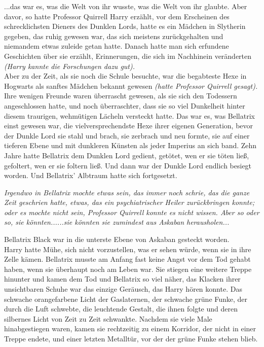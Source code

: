 {...das war es, was die Welt von ihr wusste, was die Welt von ihr glaubte. Aber davor, so hatte Professor Quirrell Harry erzählt, vor dem Erscheinen des schrecklichsten Dieners des Dunklen Lords, hatte es ein Mädchen in Slytherin gegeben, das ruhig gewesen war, das sich meistens zurückgehalten und niemandem etwas zuleide getan hatte. Danach hatte man sich erfundene Geschichten über sie erzählt, Erinnerungen, die sich im Nachhinein veränderten \emph{(Harry kannte die Forschungen dazu gut).}\\ Aber zu der Zeit, als sie noch die Schule besuchte, war die begabteste Hexe in Hogwarts als sanftes Mädchen bekannt gewesen \emph{(hatte Professor Quirrell gesagt).}\\ Ihre wenigen Freunde waren überrascht gewesen, als sie sich den Todessern angeschlossen hatte, und noch überraschter, dass sie so viel Dunkelheit hinter diesem traurigen, wehmütigen Lächeln versteckt hatte. Das war es, was Bellatrix einst gewesen war, die vielversprechendste Hexe ihrer eigenen Generation, bevor der Dunkle Lord sie stahl und brach, sie zerbrach und neu formte, sie auf einer tieferen Ebene und mit dunkleren Künsten als jeder Imperius an sich band. Zehn Jahre hatte Bellatrix dem Dunklen Lord gedient, getötet, wen er sie töten ließ, gefoltert, wen er sie foltern ließ. Und dann war der Dunkle Lord endlich besiegt worden. Und Bellatrix' Albtraum hatte sich fortgesetzt.

\emph{Irgendwo in Bellatrix mochte etwas sein, das immer noch schrie, das die ganze Zeit geschrien hatte, etwas, das ein psychiatrischer Heiler zurückbringen konnte; oder es mochte nicht sein, Professor Quirrell konnte es nicht wissen. Aber so oder so, sie könnten......sie könnten sie zumindest aus Askaban herausholen...}

Bellatrix Black war in die unterste Ebene von Askaban gesteckt worden.\\ Harry hatte Mühe, sich nicht vorzustellen, was er sehen würde, wenn sie in ihre Zelle kämen. Bellatrix musste am Anfang fast keine Angst vor dem Tod gehabt haben, wenn sie überhaupt noch am Leben war. Sie stiegen eine weitere Treppe hinunter und kamen dem Tod und Bellatrix so viel näher, das Klacken ihrer unsichtbaren Schuhe war das einzige Geräusch, das Harry hören konnte. Das schwache orangefarbene Licht der Gaslaternen, der schwache grüne Funke, der durch die Luft schwebte, die leuchtende Gestalt, die ihnen folgte und deren silbernes Licht von Zeit zu Zeit schwankte. Nachdem sie viele Male hinabgestiegen waren, kamen sie rechtzeitig zu einem Korridor, der nicht in einer Treppe endete, und einer letzten Metalltür, vor der der grüne Funke stehen blieb.

}
